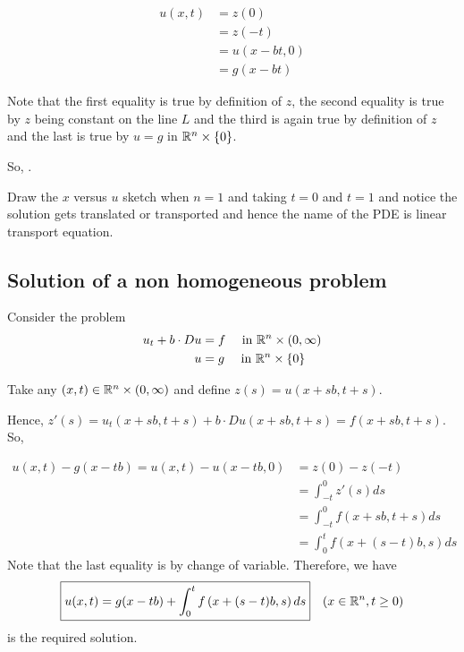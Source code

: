 \begin{align*}
    u(x,t)&= z(0) \\
    &= z(-t) \\
&= u(x-bt, 0) \\
&= g(x-bt)
\end{align*}

Note that the first equality is true by definition of $z$, the second equality is true by $z$ being constant on the line $L$ and the third is again true by definition of $z$ and the last is true by $u=g$ in $\mathbb R ^n \times \left\{ 0 \right\}$.

So, .

\begin{remark}
    Draw the $x$ versus $u$ sketch when $n=1$ and taking $t=0$ and $t=1$ and notice the solution gets translated or transported and hence the name of the PDE is linear transport equation.
\end{remark}



\subsection{Solution of a non  homogeneous problem}
Consider the problem
\begin{align*}
    u_t + b\cdot Du &= f \quad \text{ in } \mathbb R ^n \times (0,\infty ) \\
    u &= g \quad \text{ in } \mathbb R^n \times \left\{ 0 \right\}
\end{align*}
 
Take any $\left( x,t \right) \in \mathbb R ^n \times \left( 0, \infty \right)$ and define $z(s)= u (x+sb, t+s)$.

Hence, $z'(s) = u_t (x+sb, t+s ) + b \cdot Du (x+sb, t+s) = f(x+sb , t+s )$. So,

\begin{align*}
    u(x,t)-g(x-tb) = u(x,t)-u(x-tb,0) &= z(0) - z(-t) \\
    &= \int_{-t}^{0} z'(s) ds \\
    &= \int_{-t}^{0} f\left( x+sb, t+s \right) ds \\
    &= \int_{0}^{t} f\left( x+(s-t)b, s \right) ds
\end{align*}
Note that the last equality is by change of variable. Therefore, we have 
\begin{equation*}
    \boxed{u(x,t)=g(x-tb)+\int_{0}^{t} f\left( x+(s-t)b, s\right) ds} \quad (x\in \mathbb R ^n , t \ge 0)
\end{equation*}
is the required solution.


